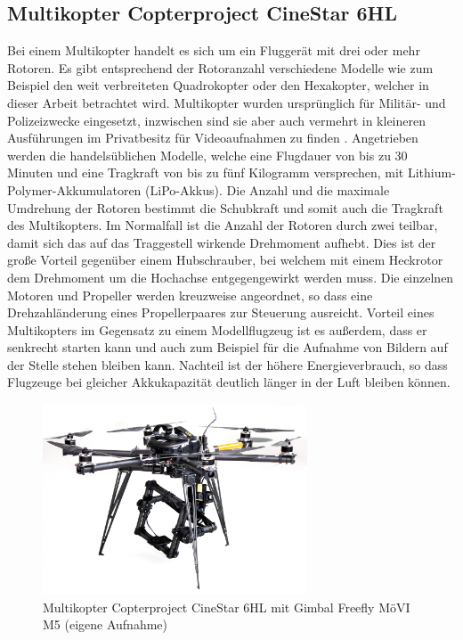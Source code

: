 \documentclass[a4paper,12pt,bibliography=totoc, listof=totoc,titlepage,pointlessnumbers]{scrreprt}
\begin{document}
\subsection{Multikopter Copterproject CineStar 6HL}
Bei einem Multikopter handelt es sich um ein Fluggerät mit drei oder mehr Rotoren. Es gibt entsprechend der Rotoranzahl verschiedene Modelle wie zum Beispiel den weit verbreiteten Quadrokopter oder den Hexakopter, welcher in dieser Arbeit betrachtet wird. Multikopter wurden ursprünglich für Militär- und Polizeizwecke eingesetzt, inzwischen sind sie aber auch vermehrt in kleineren Ausführungen im Privatbesitz für Videoaufnahmen zu finden \citep{Quadro}. Angetrieben werden die handelsüblichen Modelle, welche eine Flugdauer von bis zu 30 Minuten und eine Tragkraft von bis zu fünf Kilogramm versprechen, mit Lithium-Polymer-Akkumulatoren (LiPo-Akkus). Die Anzahl und die maximale Umdrehung der Rotoren bestimmt die Schubkraft und somit auch die Tragkraft des Multikopters. Im Normalfall ist die Anzahl der Rotoren durch zwei teilbar, damit sich das auf das Traggestell wirkende Drehmoment aufhebt. Dies ist der große Vorteil gegenüber einem Hubschrauber, bei welchem mit einem Heckrotor dem Drehmoment um die Hochachse entgegengewirkt werden muss. Die einzelnen Motoren und Propeller werden kreuzweise angeordnet, so dass eine Drehzahländerung eines Propellerpaares zur Steuerung ausreicht. Vorteil eines Multikopters im Gegensatz zu einem Modellflugzeug ist es außerdem, dass er senkrecht starten kann und auch zum Beispiel für die Aufnahme von Bildern auf der Stelle stehen bleiben kann. Nachteil ist der höhere Energieverbrauch, so dass Flugzeuge bei gleicher Akkukapazität deutlich länger in der Luft bleiben können. \citep{Bachfeld}

\begin{figure}[ht!]
 \centering
 \includegraphics[width=0.7\textwidth]{./img/uav.jpg}
 \caption{Multikopter Copterproject CineStar 6HL mit Gimbal Freefly MöVI M5 (eigene Aufnahme)}
 \label{img:uav}
\end{figure}
\end{document}

